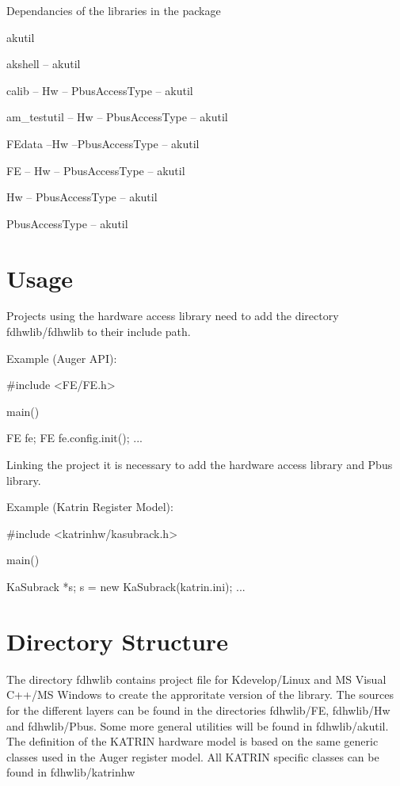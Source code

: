 \begin{DoxyVerb}Dependancies of the libraries in the package
\end{DoxyVerb}


\begin{DoxyVerb}   akutil
  
   akshell -- akutil
  
   
   calib -- Hw -- Pbus\<AccessType\> -- akutil
  
   am_testutil -- Hw -- Pbus\<AccessType\> -- akutil
  
   FEdata --Hw --Pbus\<AccessType\> -- akutil
    
  
   FE -- Hw -- Pbus\<AccessType\> -- akutil
  
   Hw -- Pbus\<AccessType\> -- akutil
   
   Pbus\<AccessType\> -- akutil \end{DoxyVerb}
\hypertarget{index_fdhwlib_usage}{}\section{Usage}\label{index_fdhwlib_usage}
Projects using the hardware access library need to add the directory fdhwlib/fdhwlib to their include path.

Example (Auger A\-P\-I)\-: \begin{DoxyVerb}#include <FE/FE.h>

main(){

  FE fe;
  FE fe.config.init();
  ...

}
\end{DoxyVerb}
 Linking the project it is necessary to add the hardware access library and Pbus library.

Example (Katrin Register Model)\-: \begin{DoxyVerb}#include <katrinhw/kasubrack.h>

main(){

   KaSubrack *s;
   s = new KaSubrack(katrin.ini);
   ...
}  
\end{DoxyVerb}
\hypertarget{index_fdhwlib_dirs}{}\section{Directory Structure}\label{index_fdhwlib_dirs}
The directory fdhwlib contains project file for Kdevelop/\-Linux and M\-S Visual C++/\-M\-S Windows to create the approritate version of the library. The sources for the different layers can be found in the directories fdhwlib/F\-E, fdhwlib/\-Hw and fdhwlib/Pbus. Some more general utilities will be found in fdhwlib/akutil. The definition of the K\-A\-T\-R\-I\-N hardware model is based on the same generic classes used in the Auger register model. All K\-A\-T\-R\-I\-N specific classes can be found in fdhwlib/katrinhw

